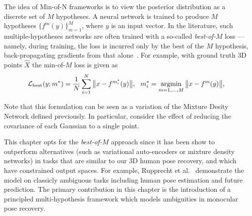 The idea of Min-of-N frameworks is to view the posterior distribution as a discrete set of $M$ hypotheses. A neural network is trained to produce $M$ hypotheses $\{f^{m}(y)\}_{m=1}^{M}$, where $y$ is an input vector. In the literature, such multiple-hypotheses networks are often trained with a so-called \emph{best-of-$M$} loss --- namely, during training, the loss is incurred only by the best of the $M$ hypothesis, back-propagating gradients from that alone~\cite{guzman2012multiple}. For example, with ground truth 3D points $\hat{X}$ the min-of-$M$ loss is given as
\begin{equation}
  \mathcal{L}_\text{best}(y;m^*)
  =
  \frac{1}{N}
  \sum_{i=1}^N
  \big \| x - f^{m_i^*}(y) \big \|,
  ~~
  m_i^*
  =
  \operatornamewithlimits{argmin}_{m=1,\dots,M}
  \big \| x -  f^{m}(y) \big \|,
\end{equation}

Note that this formulation can be seen as a variation of the Mixture Desity Network defined previously. In particular, consider the effect of reducing the covariance of each Gaussian to a single point.


This chapter opts for the \emph{best-of-$M$} approach since it has been show to outperform  alternatives (such as variational auto-encoders or mixture density networks) in tasks that are similar to our 3D human pose recovery, and which have constrained output spaces. For example, Rupprecht et al.~\cite{rupprecht17learning} demonstrate the model on classicly ambiguous tasks including human pose estimation and future prediction. The primary contribution in this chapter is the introduction of a principled multi-hypothesis framework which models ambiguities in monocular pose recovery.






